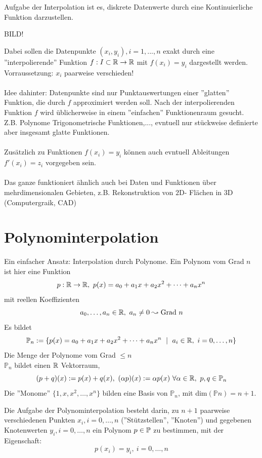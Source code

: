 \documentclass[../Skript.tex]{subfiles}
\begin{document}
Aufgabe der Interpolation ist es, diskrete Datenwerte durch eine Kontinuierliche Funktion darzustellen.
\begin{center}
    BILD!
\end{center}
Dabei sollen die Datenpunkte $(x_i,y_i), i=1,...,n$ exakt durch eine ''interpolierende'' Funktion $f:I\subset\mathbb{R} \to\mathbb{R}$ mit 
$f(x_i)=y_i$ dargestellt werden. Vorraussetzung: $x_i$ paarweise verschieden!\\\\
Idee dahinter: Datenpunkte sind nur Punktauswertungen einer ''glatten'' Funktion, die durch $f$ approximiert werden soll. 
Nach der interpolierenden Funktion $f$ wird üblicherweise in einem ''einfachen'' Funktionenraum gesucht. Z.B. Polynome 
Trigonometrische Funktionen,..., evntuell nur stückweise definierte aber insgesamt glatte Funktionen.\\\\
Zusätzlich zu Funktionen $f(x_i)=y_i$ können auch evntuell Ableitungen $f'(x_i)=z_i$ vorgegeben sein.\\\\
Das ganze funktioniert ähnlich auch bei Daten und Funktionen über mehrdimensionalen Gebieten, z.B. Rekonstruktion von $2$D-
Flächen in $3$D (Computergraik, CAD) 

\section{Polynominterpolation}
Ein einfacher Ansatz: Interpolation durch Polynome. 
Ein Polynom vom Grad $n$ ist hier eine Funktion\\
\[p:\mathbb{R} \to \mathbb{R} , \ p(x)= a_0+a_1x+a_2x^2+\dots+a_nx^n\] mit reellen Koeffizienten \[a_0,\dots,a_n\in\mathbb{R},\ a_n\neq 0 \leadsto 
\text{Grad } n\]
Es bildet
\[\mathbb{P}_n:=\{p(x)=a_0+a_1x+a_2x^2+\dots+a_nx^n \ \mid \ a_i\in\mathbb{R} ,\ i=0,\dots, n\}\] Die Menge der Polynome vom Grad 
$\leq n$\\
$\mathbb{P}_n$ bildet einen $\mathbb{R}$ Vektorraum, $$(p+q)(x):=p(x)+q(x), \ (\alpha p)(x):=\alpha p(x)\  \forall \alpha\in\R,\ 
p,q\in\bbP_n$$
Die ''Monome'' $\{1,x,x^2,\dots,x^n\}$ bilden eine Basis von $\mathbb{P}_n$, mit dim$(\mathbb{P}n)=n+1$.
\begin{definition}
    Die Aufgabe der Polynominterpolation besteht darin, zu $n+1$ paarweise verschiedenen Punkten $x_i, i=0,\dots, n$ 
    (''Stützstellen'', ''Knoten'') und gegebenen Knotenwerten $y_i, i=0, \dots, n$ ein Polynom $p\in\mathbb{P}$ zu bestimmen, mit 
    der Eigenschaft: \[p(x_i) = y_i, \ i=0,\dots,n\]
\end{definition}
\end{document}

